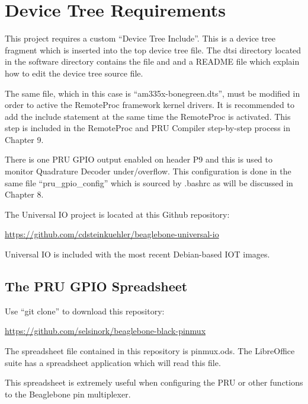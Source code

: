 %
%
%

\chapter{Device Tree Requirements}

This project requires a custom ``Device Tree Include''.  This is a device tree fragment which is inserted into the top device tree file.  The dtsi directory located in the software directory contains the file and and a README file which explain how to edit the device tree source file.

The same file, which in this case is ``am335x-bonegreen.dts'', must be modified in order to active the RemoteProc framework kernel drivers.  It is recommended to add the include statement at the same time the RemoteProc is activated.  This step is included in the RemoteProc and PRU Compiler step-by-step process in Chapter 9.


There is one PRU GPIO output enabled on header P9 and this is used to monitor Quadrature Decoder under/overflow.  This configuration is done in the same file ``pru\_gpio\_config'' which is sourced by .bashrc as will be discussed in Chapter 8.

The Universal IO project is located at this Github repository:

\url{https://github.com/cdsteinkuehler/beaglebone-universal-io}

Universal IO is included with the most recent Debian-based IOT images.

\section{The PRU GPIO Spreadsheet}

Use ``git clone'' to download this repository:

\url{https://github.com/selsinork/beaglebone-black-pinmux}

The spreadsheet file contained in this repository is pinmux.ods.
The LibreOffice suite has a spreadsheet application which will read
this file.

This spreadsheet is extremely useful when configuring the PRU or
other functions to the Beaglebone pin multiplexer.



